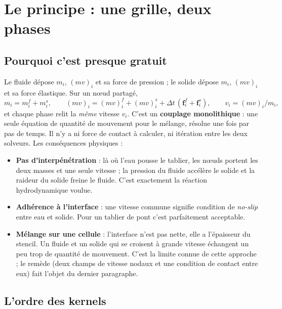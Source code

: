 \documentclass[11pt,a4paper]{article}
\begin{document}
\section{Le principe : une grille, deux phases}

\subsection{Pourquoi c'est presque gratuit}

Le fluide dépose $m_i$, $(mv)_i$ et sa force de pression ; le solide dépose $m_i$, $(mv)_i$ et sa
force élastique. Sur un n\oe ud partagé,
\[
  m_i = m_i^{f} + m_i^{s},\qquad (mv)_i = (mv)_i^{f} + (mv)_i^{s} + \Delta t\,(\mathbf f_i^{f} + \mathbf f_i^{s}),
  \qquad v_i = (mv)_i / m_i,
\]
et chaque phase relit la \emph{même} vitesse $v_i$. C'est un \textbf{couplage monolithique} : une
seule équation de quantité de mouvement pour le mélange, résolue une fois par pas de temps. Il
n'y a ni force de contact à calculer, ni itération entre les deux solveurs. Les conséquences
physiques :
\begin{itemize}
  \item \textbf{Pas d'interpénétration} : là où l'eau pousse le tablier, les n\oe uds portent les deux
        masses et une seule vitesse ; la pression du fluide accélère le solide et la raideur du
        solide freine le fluide. C'est exactement la réaction hydrodynamique voulue.
  \item \textbf{Adhérence à l'interface} : une vitesse commune signifie condition de \emph{no-slip}
        entre eau et solide. Pour un tablier de pont c'est parfaitement acceptable.
  \item \textbf{Mélange sur une cellule} : l'interface n'est pas nette, elle a l'épaisseur du
        stencil. Un fluide et un solide qui se croisent à grande vitesse échangent un peu trop de
        quantité de mouvement. C'est la limite connue de cette approche ; le remède (deux champs
        de vitesse nodaux et une condition de contact entre eux) fait l'objet du dernier
        paragraphe.
\end{itemize}

\subsection{L'ordre des kernels}
\end{document}

